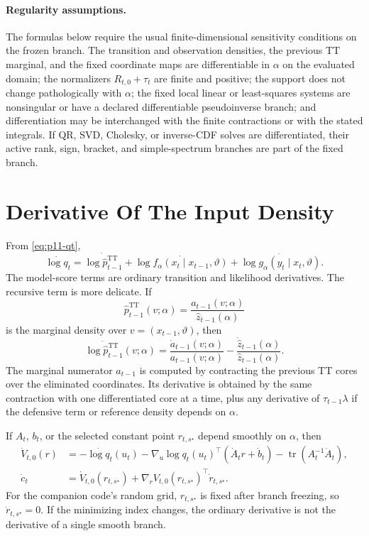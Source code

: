 \documentclass[11pt]{article}
\newcommand{\TT}{\mathrm{TT}}
\begin{document}
\paragraph{Regularity assumptions.}
The formulas below require the usual finite-dimensional sensitivity
conditions on the frozen branch.  The transition and observation densities,
the previous TT marginal, and the fixed coordinate maps are differentiable in
\(\alpha\) on the evaluated domain; the normalizers \(R_{t,0}+\tau_t\) are
finite and positive; the support does not change pathologically with
\(\alpha\); the fixed local linear or least-squares systems are nonsingular
or have a declared differentiable pseudoinverse branch; and differentiation
may be interchanged with the finite contractions or with the stated integrals.
If QR, SVD, Cholesky, or inverse-CDF solves are differentiated, their active
rank, sign, bracket, and simple-spectrum branches are part of the fixed branch.

\section{Derivative Of The Input Density}

From \eqref{eq:p11-qt},
\[
  \dot{\log q_t}
  =
  \dot{\log \widehat p_{t-1}^{\TT}}
  +
  \dot{\log f_\alpha(x_t\mid x_{t-1},\vartheta)}
  +
  \dot{\log g_\alpha(y_t\mid x_t,\vartheta)}.
  \label{eq:p11-logq-derivative}
\]
The model-score terms are ordinary transition and likelihood derivatives.  The
recursive term is more delicate.  If
\[
  \widehat p_{t-1}^{\TT}(v;\alpha)
  =
  \frac{a_{t-1}(v;\alpha)}{\widehat z_{t-1}(\alpha)}
  \]
is the marginal density over \(v=(x_{t-1},\vartheta)\), then
\[
  \dot{\log \widehat p_{t-1}^{\TT}}(v;\alpha)
  =
  \frac{\dot a_{t-1}(v;\alpha)}{a_{t-1}(v;\alpha)}
  -
  \frac{\dot{\widehat z}_{t-1}(\alpha)}
        {\widehat z_{t-1}(\alpha)}.
  \label{eq:p11-prev-score}
\]
The marginal numerator \(a_{t-1}\) is computed by contracting the previous
TT cores over the eliminated coordinates.  Its derivative is obtained by the
same contraction with one differentiated core at a time, plus any derivative
of \(\tau_{t-1}\lambda\) if the defensive term or reference density depends on
\(\alpha\).

If \(A_t\), \(b_t\), or the selected constant point \(r_{t,s^\star}\) depend
smoothly on \(\alpha\), then
\[
\begin{aligned}
  \dot V_{t,0}(r)
  &=
  -\dot{\log q_t}(u_t)
  -
  \nabla_{u}\log q_t(u_t)^\top
      (\dot A_t r+\dot b_t)
  -
  \operatorname{tr}(A_t^{-1}\dot A_t),\\
  \dot c_t
  &=
  \dot V_{t,0}(r_{t,s^\star})
  +
  \nabla_r V_{t,0}(r_{t,s^\star})^\top \dot r_{t,s^\star}.
  \label{eq:p11-v-derivative}
\end{aligned}
\]
For the companion code's random grid, \(r_{t,s^\star}\) is fixed after branch
freezing, so \(\dot r_{t,s^\star}=0\).  If the minimizing index changes, the
ordinary derivative is not the derivative of a single smooth branch.
\end{document}
